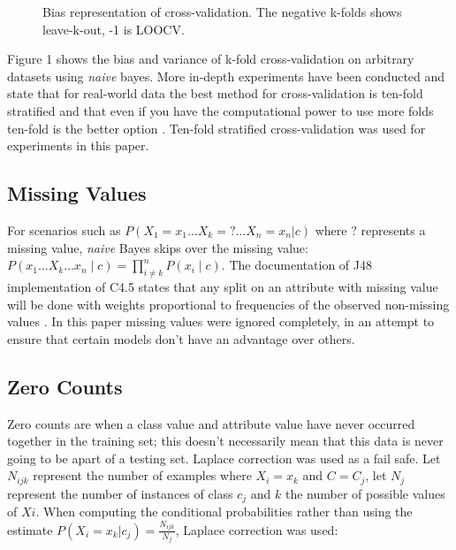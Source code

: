 \documentclass{cmppgr}
\begin{document}
\begin{figure}[!ht]
	\begin{subfigure}[b]{0.40\textwidth}
	\end{subfigure}
	\caption{Bias representation of cross-validation. The negative k-folds shows leave-k-out, -1 is LOOCV.}
\end{figure} 

Figure 1 shows the bias and variance of k-fold cross-validation on arbitrary datasets using \textit{naive} bayes. More in-depth experiments have been conducted and state that for real-world data the best method for cross-validation is ten-fold stratified and that even if you have the computational power to use more folds ten-fold is the better option \cite{kohavi1995study}. Ten-fold stratified cross-validation was used for experiments in this paper. 
 
 
\subsection{Missing Values}
For scenarios such as $P(X_1=x_1 \dots X_k=? \dots X_n=x_n|c)$ where $?$ represents a missing value, \textit{naive} Bayes skips over the missing value:
$P(x_1 \dots X_k \dots x_n \mid c)= \prod_{i \neq k }^{n}P(x_i \mid c)$.  The documentation of J48 implementation of C4.5 states that any split on an attribute with missing value will be done with weights proportional to frequencies of the observed non-missing values \cite{witten2016data}. In this paper missing values were ignored completely, in an attempt to ensure that certain models don't have an advantage over others.
 
\subsection{Zero Counts}
Zero counts are when a class value and attribute value have never occurred together in the training set; this doesn't necessarily mean that this data is never going to be apart of a testing set. Laplace correction was used as a fail safe. Let $N_{ijk}$ represent the number of examples where $X_i=x_k$ and $C=C_j$, let $N_j$ represent the number of instances of class $c_j$ and $k$ the number of possible values of $Xi$. When computing the conditional probabilities rather than using the estimate $P(X_i= x_k | c_j) =\frac{N_{ijk}}{N_j}$, Laplace correction was used:
\end{document}
